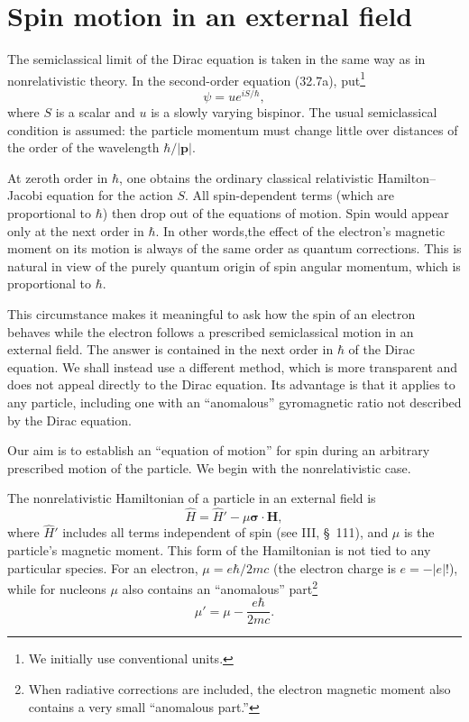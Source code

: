 
\section{Spin motion in an external field}

The semiclassical limit of the Dirac equation is taken in the same way as in nonrelativistic theory. In the second-order equation (32.7a), put\footnote{We initially use conventional units.}
\[
\psi=ue^{iS/\hbar},
\]
where $S$ is a scalar and $u$ is a slowly varying bispinor. The usual semiclassical condition is assumed: the particle momentum must change little over distances of the order of the wavelength $\hbar/|\mathbf p|$.

At zeroth order in $\hbar$, one obtains the ordinary classical relativistic Hamilton--Jacobi equation for the action $S$. All spin-dependent terms (which are proportional to $\hbar$) then drop out of the equations of motion. Spin would appear only at the next order in $\hbar$. In other words,the effect of the electron's magnetic moment on its motion is always of the same order as quantum corrections. This is natural in view of the purely quantum origin of spin angular momentum, which is proportional to $\hbar$.

This circumstance makes it meaningful to ask how the spin of an electron behaves while the electron follows a prescribed semiclassical motion in an external field. The answer is contained in the next order in $\hbar$ of the Dirac equation. We shall instead use a different method, which is more transparent and does not appeal directly to the Dirac equation. Its advantage is that it applies to any particle, including one with an ``anomalous'' gyromagnetic ratio not described by the Dirac equation.

Our aim is to establish an ``equation of motion'' for spin during an arbitrary prescribed motion of the particle. We begin with the nonrelativistic case.

The nonrelativistic Hamiltonian of a particle in an external field is
\begin{equation}
\widehat H=\widehat H'-\mu\boldsymbol\sigma\cdot\mathbf H,
\tag{41.1}
\end{equation}
where $\widehat H'$ includes all terms independent of spin (see III, \S~111), and $\mu$ is the particle's magnetic moment. This form of the Hamiltonian is not tied to any particular species. For an electron, $\mu=e\hbar/2mc$ (the electron charge is $e=-|e|$!), while for nucleons $\mu$ also contains an ``anomalous'' part\footnote{When radiative corrections are included, the electron magnetic moment also contains a very small ``anomalous part.''}
\begin{equation}
\mu'=\mu-\frac{e\hbar}{2mc}.
\tag{41.2}
\end{equation}

